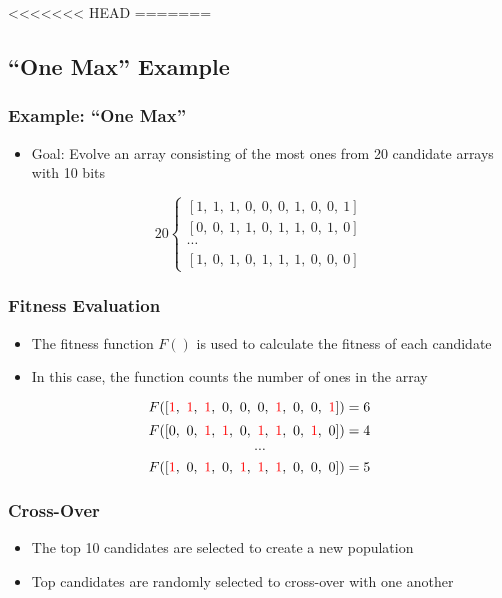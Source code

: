 \documentclass{beamer}
\begin{document}
\begin{frame}
<<<<<<< HEAD
=======
\subsection*{``One Max'' Example}
\begin{frame}
  \frametitle{Example: ``One Max''}
\begin{itemize}
\item Goal: Evolve an array consisting of the most ones from 20 candidate arrays with 10 bits
\end{itemize}
\[
20 \left\{\begin{matrix}
[  1,~1,~1,~0,~ 0,~0,~1,~0,~0,~1] \\ %
[  0,~0,~1,~1,~ 0,~1,~1,~0,~1,~0] \\
\cdots\\
[  1 ,~0,~1,~0,~ 1,~1,~1,~0,~0,~0] 
\end{matrix}\right.
\]
\end{frame}

\begin{frame}
  \frametitle{Fitness Evaluation}
\begin{itemize}
\item The fitness function $F()$ is used to calculate the fitness of each candidate
\item In this case, the function counts the number of ones in the array
\end{itemize}

\[F([   \textcolor{red}{1},~\textcolor{red}{1},~ \textcolor{red}{1},~0,~ 0,~0,~\textcolor{red}{1},~ 0,~ 0,~ \textcolor{red}{1}]  ) = 6 \]%
\[F([  0 ,~0,~ \textcolor{red}{1},~ \textcolor{red}{1},~ 0,~ \textcolor{red}{1},~ \textcolor{red}{1},~0,~ \textcolor{red}{1},~0]) = 4\]
\[\cdots\]
\[F([   \textcolor{red}{1},~0,~ \textcolor{red}{1},~0,~  \textcolor{red}{1},~ \textcolor{red}{1},~ \textcolor{red}{1},~0,~0,~0]) = 5\]
\end{frame}

\begin{frame}
  \frametitle{Cross-Over}
\begin{itemize}
\item The top 10 candidates are selected to create a new population
\item Top candidates are randomly selected to cross-over with one another
\end{itemize}

  \begin{columns}
  \begin{column}{0.5\textwidth}


\end{column}
\end{columns}
\end{frame}
\end{frame}
\end{document}
